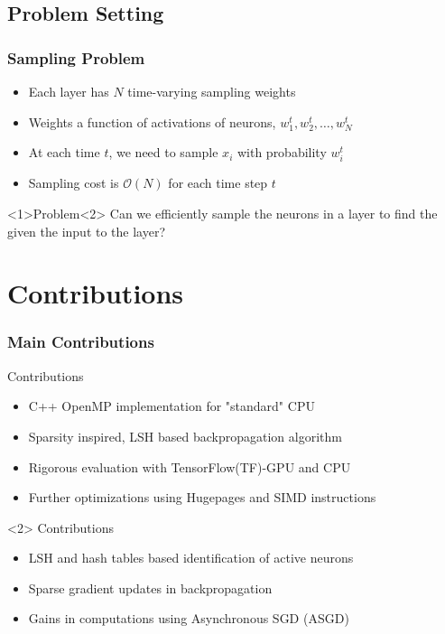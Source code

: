 \documentclass{beamer}
\begin{document}
\subsection{Problem Setting}
\begin{frame}
    \frametitle{Sampling Problem}
    \begin{itemize}
        \item Each layer has $N$ time-varying sampling weights
        \item Weights a function of activations of neurons, $w_{1}^{t},w_{2}^{t},\dots,w_{N}^{t}$
        \item At each time $t$, we need to sample $x_i$ with probability $w_{i}^{t}$
        \item Sampling cost is $\mathcal{O}(N)$ for each time step $t$
    \end{itemize}
    \begin{block}<1>{Problem}<2>
        Can we efficiently sample the neurons in a layer to find the  given the input to the layer?
    \end{block}

\end{frame}
\section{Contributions}
\begin{frame}
    \frametitle{Main Contributions}

    \begin{block}{\cite{mlsys2020_SLIDE} Contributions}
        \begin{itemize}
            \item C++ OpenMP implementation for "standard" CPU
            \item Sparsity inspired, LSH based backpropagation algorithm
            \item Rigorous evaluation with TensorFlow(TF)-GPU and CPU
            \item Further optimizations using Hugepages and SIMD instructions
        \end{itemize}
    \end{block}
    \begin{block}<2>{\cite{Spring_hashing} Contributions}
        \begin{itemize}
            \item LSH and hash tables based identification of active neurons
            \item Sparse gradient updates in backpropagation
            \item Gains in computations using Asynchronous SGD (ASGD) 
        \end{itemize}
    \end{block}

\end{frame}
\end{document}
